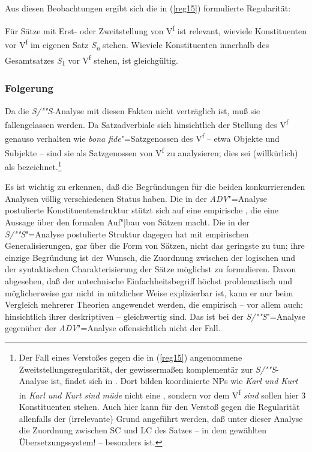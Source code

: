 \documentclass[output=paper]{langsci/langscibook}
\begin{document}
Aus diesen Beobachtungen ergibt sich die in (\ref{reg15}) formulierte Regularität:
\begin{exe}
	\ex \label{reg15} Für Sätze mit Erst- oder Zweitstellung von V\textsuperscript{f} ist relevant, wieviele Konstituenten vor V\textsuperscript{f} im eigenen Satz \textit{S\textsubscript{n}} stehen. Wieviele Konstituenten innerhalb des Gesamtsatzes \textit{S}\textsubscript{1} vor V\textsuperscript{f} stehen, ist gleichgültig.
\end{exe}

\subsubsection{Folgerung}%
\label{subsec:2-1-1-2}

Da die \textit{S/""S}-Analyse mit diesen Fakten nicht verträglich ist, muß sie fallengelassen
werden. Da Satzadverbiale sich hinsichtlich der Stellung des V\textsuperscript{f} genauso verhalten
wie \textit{bona fide}"=Satzgenossen des V\textsuperscript{f} -- etwa Objekte und Subjekte -- sind
sie als Satzgenossen von V\textsuperscript{f} zu analysieren; dies sei (willkürlich) als
 bezeichnet.\footnote{%
	Der Fall eines Verstoßes gegen die in
  (\ref{reg15}) angenommene Zweitstellungsregularität, der gewissermaßen komplementär zur
  \textit{S/""S}-Analyse ist, findet sich in \citet[131]{Eisenberg76}. Dort bilden koordinierte NPs
  wie \textit{Karl und Kurt} in \textit{Karl und Kurt sind müde} nicht eine , sondern
  vor dem V\textsuperscript{f} \textit{sind} sollen hier 3 Konstituenten stehen. Auch hier kann für
  den Verstoß gegen die Regularität allenfalls der (irrelevante) Grund angeführt werden, daß unter
  dieser Analyse die Zuordnung zwischen SC und LC des Satzes -- in dem gewählten Übersetzungssystem!
  -- besonders  ist.%
}

Es ist wichtig zu erkennen, daß die Begründungen für die beiden konkurrierenden Analysen völlig verschiedenen Status haben. Die in der \textit{ADV}"=Analyse postulierte Konstituentenstruktur stützt sich auf eine empirische , die eine Aussage über den formalen Auf"|bau von Sätzen macht. Die in der \textit{S/""S}"=Analyse postulierte Struktur dagegen hat mit empirischen Generalisierungen, gar über die Form von Sätzen, nicht das geringste zu tun; ihre einzige Begründung ist der Wunsch, die Zuordnung zwischen der logischen und der syntaktischen Charakterisierung der Sätze möglichst  zu formulieren. Davon abgesehen, daß der untechnische Einfachheitsbegriff höchst problematisch und möglicherweise gar nicht in nützlicher Weise explizierbar ist, kann er nur beim Vergleich mehrerer Theorien angewendet werden, die empirisch -- \dash vor allem auch: hinsichtlich ihrer deskriptiven  -- gleichwertig sind. Das ist bei der \textit{S/""S}"=Analyse gegenüber der \textit{ADV}"=Analyse offensichtlich nicht der Fall.
\end{document}
